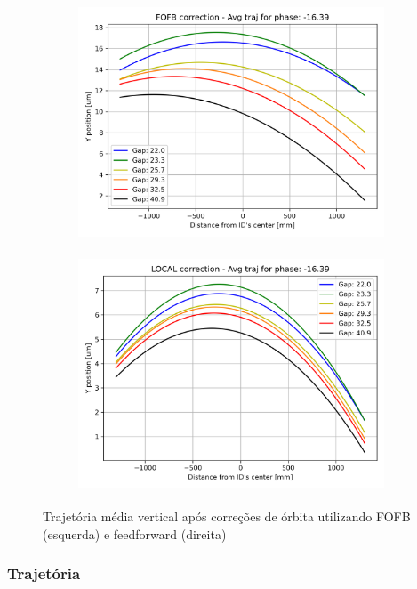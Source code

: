 \documentclass[a4paper,12pt]{article}
\begin{document}
\begin{figure}[H]
\begin{subfigure}{0.5\textwidth}
\includegraphics[width=0.9\linewidth, height=7cm]{figs/phase-16 vertical-avg-traj-FOFB.png} 
\label{fig:subim10yc-16}
\end{subfigure}
\begin{subfigure}{0.5\textwidth}
\includegraphics[width=0.9\linewidth, height=7cm]{figs/phase-16 vertical-avg-traj-LOCAL.png}
\label{fig:subim20yc-16}
\end{subfigure}
\caption{Trajetória média vertical após correções de órbita utilizando FOFB (esquerda) e feedforward (direita)}
\label{fig:-16corry}
\end{figure}



\subsubsection{Trajetória}
\end{document}

